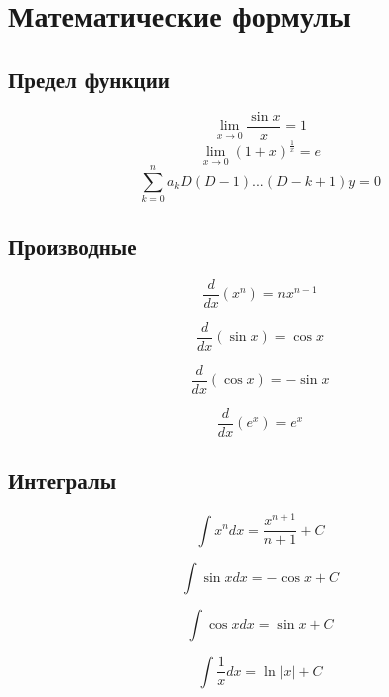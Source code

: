 \documentclass[a4paper,12pt]{article}
\begin{document}
\tableofcontents
\newpage
\section{Математические формулы}
\subsection{Предел функции}
\begin{equation}
\lim_{x\to0} \frac{\sin x}{x}=1   
\end{equation}
\begin{equation}
\lim_{x\to0} (1+x)^\frac{1}{x}=e   
\end{equation}
\begin{equation}
\sum_{k=0}^{n} a_kD(D-1)...(D-k+1)y=0 
\end{equation}

\subsection{Производные}

\begin{equation}
\frac{d}{dx}(x^n) = nx^{n-1}
\end{equation}

\begin{equation}
\frac{d}{dx}(\sin x) = \cos x
\end{equation}

\begin{equation}
\frac{d}{dx}(\cos x) = -\sin x
\end{equation}

\begin{equation}
\frac{d}{dx}(e^x) = e^x
\end{equation}
\subsection{Интегралы}

\begin{equation}
\int x^n dx = \frac{x^{n+1}}{n+1} + C
\end{equation}

\begin{equation}
\int \sin x dx = -\cos x + C
\end{equation}

\begin{equation}
\int \cos x dx = \sin x + C
\end{equation}

\begin{equation}
\int \frac{1}{x} dx = \ln|x| + C
\end{equation}
\end{document}
